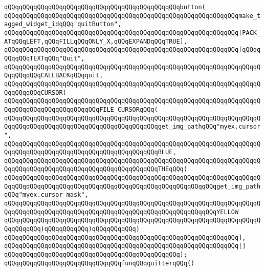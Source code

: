 \verb|qQQqqQQqqQQqqQQqqQQqqQQqqQQqqQQqqQQqqQQqqQQqqQQqbutton(|\newline
\verb|qQQqqQQqqQQqqQQqqQQqqQQqqQQqqQQqqQQqqQQqqQQqqQQqqQQqqQQqqQQqqQQqmake_tagged_widget_idqQQq"quitButton",|\newline
\verb|qQQqqQQqqQQqqQQqqQQqqQQqqQQqqQQqqQQqqQQqqQQqqQQqqQQqqQQqqQQqqQQq[PACK_ATqQQqLEFT,qQQqFILLqQQqONLY_X,qQQqEXPANDqQQqTRUE],|\newline
\verb|qQQqqQQqqQQqqQQqqQQqqQQqqQQqqQQqqQQqqQQqqQQqqQQqqQQqqQQqqQQqqQQq[qQQqqQQqqQQqTEXTqQQq"Quit",|\newline
\verb|qQQqqQQqqQQqqQQqqQQqqQQqqQQqqQQqqQQqqQQqqQQqqQQqqQQqqQQqqQQqqQQqqQQqqQQqqQQqqQQqCALLBACKqQQqquit,|\newline
\verb|qQQqqQQqqQQqqQQqqQQqqQQqqQQqqQQqqQQqqQQqqQQqqQQqqQQqqQQqqQQqqQQqqQQqqQQqqQQqqQQqCURSOR(|\newline
\verb|qQQqqQQqqQQqqQQqqQQqqQQqqQQqqQQqqQQqqQQqqQQqqQQqqQQqqQQqqQQqqQQqqQQqqQQqqQQqqQQqqQQqqQQqqQQqqQQqFILE_CURSORqQQq(|\newline
\verb|qQQqqQQqqQQqqQQqqQQqqQQqqQQqqQQqqQQqqQQqqQQqqQQqqQQqqQQqqQQqqQQqqQQqqQQqqQQqqQQqqQQqqQQqqQQqqQQqqQQqqQQqqQQqqQQqget_img_pathqQQq"myex.cursor",|\newline
\verb|qQQqqQQqqQQqqQQqqQQqqQQqqQQqqQQqqQQqqQQqqQQqqQQqqQQqqQQqqQQqqQQqqQQqqQQqqQQqqQQqqQQqqQQqqQQqqQQqqQQqqQQqqQQqqQQqBLUE,|\newline
\verb|qQQqqQQqqQQqqQQqqQQqqQQqqQQqqQQqqQQqqQQqqQQqqQQqqQQqqQQqqQQqqQQqqQQqqQQqqQQqqQQqqQQqqQQqqQQqqQQqqQQqqQQqqQQqqQQqTHEqQQq(|\newline
\verb|qQQqqQQqqQQqqQQqqQQqqQQqqQQqqQQqqQQqqQQqqQQqqQQqqQQqqQQqqQQqqQQqqQQqqQQqqQQqqQQqqQQqqQQqqQQqqQQqqQQqqQQqqQQqqQQqqQQqqQQqqQQqqQQqget_img_pathqQQq"myex.cursor_mask",|\newline
\verb|qQQqqQQqqQQqqQQqqQQqqQQqqQQqqQQqqQQqqQQqqQQqqQQqqQQqqQQqqQQqqQQqqQQqqQQqqQQqqQQqqQQqqQQqqQQqqQQqqQQqqQQqqQQqqQQqqQQqqQQqqQQqqQQqYELLOW|\newline
\verb|qQQqqQQqqQQqqQQqqQQqqQQqqQQqqQQqqQQqqQQqqQQqqQQqqQQqqQQqqQQqqQQqqQQqqQQqqQQqqQQq)qQQqqQQqqQQq)qQQqqQQqqQQq)|\newline
\verb|qQQqqQQqqQQqqQQqqQQqqQQqqQQqqQQqqQQqqQQqqQQqqQQqqQQqqQQqqQQqqQQq],|\newline
\verb|qQQqqQQqqQQqqQQqqQQqqQQqqQQqqQQqqQQqqQQqqQQqqQQqqQQqqQQqqQQqqQQq[]|\newline
\verb|qQQqqQQqqQQqqQQqqQQqqQQqqQQqqQQqqQQqqQQqqQQqqQQq);|\newline
\newline
\verb|qQQqqQQqqQQqqQQqqQQqqQQqqQQqqQQqfunqQQqquitterqQQq()|\newline
